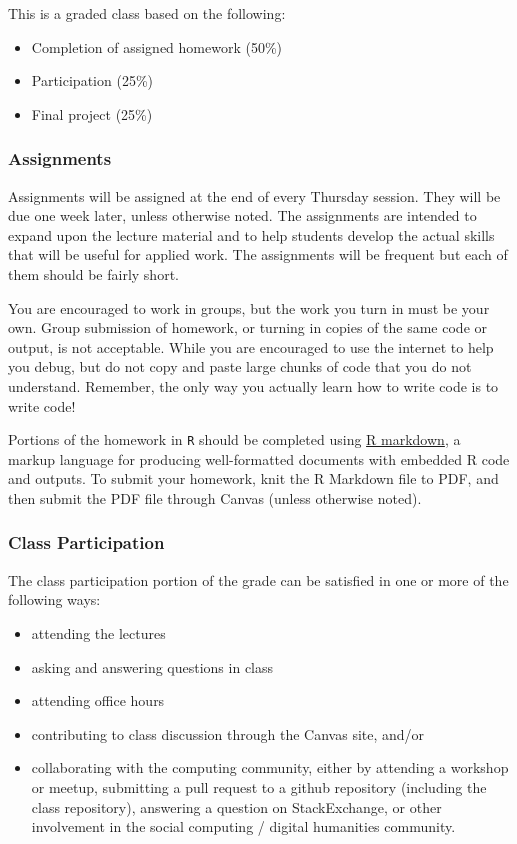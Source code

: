 \documentclass[]{book}
\providecommand{\tightlist}{%
  \setlength{\itemsep}{0pt}\setlength{\parskip}{0pt}}
\begin{document}
This is a graded class based on the following:

\begin{itemize}
\tightlist
\item
  Completion of assigned homework (50\%)
\item
  Participation (25\%)
\item
  Final project (25\%)
\end{itemize}

\subsubsection*{Assignments}\label{assignments}

Assignments will be assigned at the end of every Thursday session. They
will be due one week later, unless otherwise noted. The assignments are
intended to expand upon the lecture material and to help students
develop the actual skills that will be useful for applied work. The
assignments will be frequent but each of them should be fairly short.

You are encouraged to work in groups, but the work you turn in must be
your own. Group submission of homework, or turning in copies of the same
code or output, is not acceptable. While you are encouraged to use the
internet to help you debug, but do not copy and paste large chunks of
code that you do not understand. Remember, the only way you actually
learn how to write code is to write code!

Portions of the homework in \texttt{R} should be completed using
\href{https://rmarkdown.rstudio.com/}{R markdown}, a markup language for
producing well-formatted documents with embedded R code and outputs. To
submit your homework, knit the R Markdown file to PDF, and then submit
the PDF file through Canvas (unless otherwise noted).

\subsubsection*{Class Participation}\label{class-participation}

The class participation portion of the grade can be satisfied in one or
more of the following ways:

\begin{itemize}
\tightlist
\item
  attending the lectures
\item
  asking and answering questions in class
\item
  attending office hours
\item
  contributing to class discussion through the Canvas site, and/or
\item
  collaborating with the computing community, either by attending a
  workshop or meetup, submitting a pull request to a github repository
  (including the class repository), answering a question on
  StackExchange, or other involvement in the social computing / digital
  humanities community.
\end{itemize}
\end{document}
